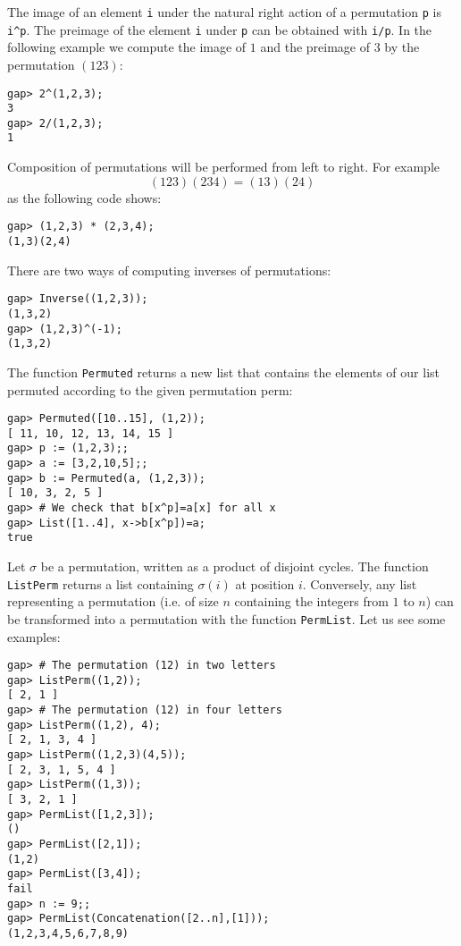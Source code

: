 The image of an element \lstinline{i} under the natural right action of a
permutation \lstinline{p} is \lstinline{i^p}. The preimage of the element
\lstinline{i} under \lstinline{p} can be obtained with \lstinline{i/p}. In the
following example we compute the image of $1$ and the preimage of $3$ by the
permutation $(123)$: 
\begin{lstlisting}
gap> 2^(1,2,3);
3
gap> 2/(1,2,3);
1
\end{lstlisting}
Composition of permutations will be performed from left to right. For example
\[
  (123)(234)=(13)(24)
\]
as the following code shows: 
\begin{lstlisting}
gap> (1,2,3) * (2,3,4);
(1,3)(2,4)
\end{lstlisting}
There are two ways of computing inverses of permutations:
\begin{lstlisting}
gap> Inverse((1,2,3));
(1,3,2)
gap> (1,2,3)^(-1);
(1,3,2)
\end{lstlisting}

\begin{example}
    The function \lstinline{Permuted} returns a new list that contains 
    the elements of our list permuted according to 
    the given permutation perm:
\begin{lstlisting}
gap> Permuted([10..15], (1,2));
[ 11, 10, 12, 13, 14, 15 ]
gap> p := (1,2,3);;
gap> a := [3,2,10,5];;
gap> b := Permuted(a, (1,2,3));
[ 10, 3, 2, 5 ]
gap> # We check that b[x^p]=a[x] for all x
gap> List([1..4], x->b[x^p])=a;
true
\end{lstlisting}
\end{example}

Let $\sigma$ be a permutation, written as a product of disjoint cycles.  The
function \lstinline{ListPerm} returns a list containing $\sigma(i)$ at position
$i$.  Conversely, any list representing a permutation (i.e. of size $n$ containing 
the integers from $1$ to $n$) 
can be transformed into a permutation
with the function
\lstinline{PermList}. Let us see some examples:
\begin{lstlisting}
gap> # The permutation (12) in two letters
gap> ListPerm((1,2));                                                 
[ 2, 1 ]
gap> # The permutation (12) in four letters
gap> ListPerm((1,2), 4);
[ 2, 1, 3, 4 ]
gap> ListPerm((1,2,3)(4,5));
[ 2, 3, 1, 5, 4 ]
gap> ListPerm((1,3));
[ 3, 2, 1 ]
gap> PermList([1,2,3]);
()
gap> PermList([2,1]);
(1,2)
gap> PermList([3,4]);
fail
gap> n := 9;;
gap> PermList(Concatenation([2..n],[1]));
(1,2,3,4,5,6,7,8,9)
\end{lstlisting}

